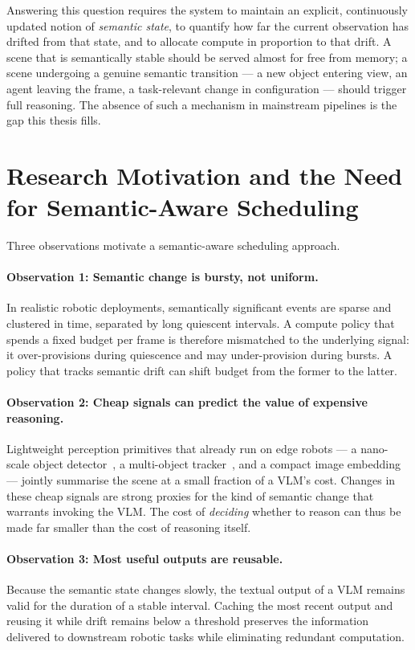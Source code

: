Answering this question requires the system to maintain an explicit,
continuously updated notion of \emph{semantic state}, to quantify how far the
current observation has drifted from that state, and to allocate compute in
proportion to that drift. A scene that is semantically stable should be
served almost for free from memory; a scene undergoing a genuine semantic
transition --- a new object entering view, an agent leaving the frame, a task-relevant
change in configuration --- should trigger full reasoning. The absence of such a
mechanism in mainstream pipelines is the gap this thesis fills.

\section{Research Motivation and the Need for Semantic-Aware Scheduling}
\label{sec:intro-motivation}

Three observations motivate a semantic-aware scheduling approach.

\paragraph{Observation 1: Semantic change is bursty, not uniform.}
In realistic robotic deployments, semantically significant events are sparse
and clustered in time, separated by long quiescent intervals. A compute
policy that spends a fixed budget per frame is therefore mismatched to the
underlying signal: it over-provisions during quiescence and may
under-provision during bursts. A policy that tracks semantic drift can shift
budget from the former to the latter.

\paragraph{Observation 2: Cheap signals can predict the value of expensive
reasoning.}
Lightweight perception primitives that already run on edge robots --- a
nano-scale object detector~\cite{Jocher2023YOLOv8}, a multi-object
tracker~\cite{Zhang2022ByteTrack}, and a compact image
embedding~\cite{Radford2021CLIP} --- jointly summarise the scene at a small
fraction of a VLM's cost. Changes in these cheap signals are strong proxies
for the kind of semantic change that warrants invoking the VLM. The cost of
\emph{deciding} whether to reason can thus be made far smaller than the cost
of reasoning itself.

\paragraph{Observation 3: Most useful outputs are reusable.}
Because the semantic state changes slowly, the textual output of a VLM
remains valid for the duration of a stable interval. Caching the most recent
output and reusing it while drift remains below a threshold preserves the
information delivered to downstream robotic tasks while eliminating redundant
computation.

